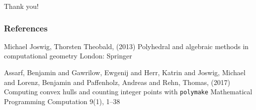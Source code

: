 \documentclass[9pt]{beamer}
\theoremstyle{definition}
\begin{document}
\begin{frame}[fragile]
  \begin{center}
    Thank you!
  \end{center}
\end{frame}

\begin{frame}
  \frametitle{References}
  \footnotesize{
    \begin{thebibliography}{99} %
     Michael Joswig, Thorsten Theobald, (2013)
      \newblock Polyhedral and algebraic methods in computational geometry
      \newblock London: Springer

     Assarf, Benjamin and Gawrilow, Ewgenij and Herr, Katrin and Joswig, Michael and Lorenz, Benjamin and Paffenholz, Andreas and Rehn, Thomas, (2017)
      \newblock Computing convex hulls and counting integer points with \texttt{polymake}
      \newblock Mathematical Programming Computation 9(1), 1--38 



  \end{thebibliography}
  }
\end{frame}

\end{document}
